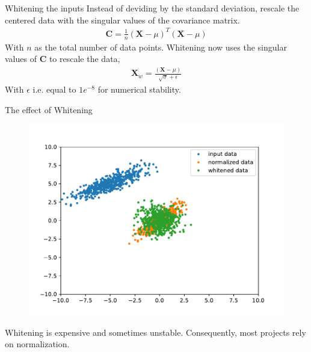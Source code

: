 \documentclass[notes]{beamer}
\begin{document}
    \begin{frame}{Whitening the inputs}
      Instead of deviding by the standard deviation, rescale the centered data with the singular values of the covariance matrix.
      \begin{align}
        \mathbf{C} = \frac{1}{n} (\mathbf{X} - \mu)^T(\mathbf{X} - \mu)
      \end{align}
      With $n$ as the total number of data points.
      Whitening now uses the singular values of $\mathbf{C}$ to rescale the data,
      \begin{align}
        \mathbf{X}_w = \frac{(\mathbf{X} - \mu)}{\sqrt{\sigma} + \epsilon}
      \end{align}
      With $\epsilon$ i.e. equal to $1e^{-8}$ for numerical stability.
    \end{frame}

    \begin{frame}{The effect of Whitening}
    \begin{figure}
    \includegraphics[width=\linewidth]{./figures/whitened.pdf}
      \end{figure}
      Whitening is expensive and sometimes unstable. Consequently, most projects rely on normalization.
    \end{frame}
\end{document}
